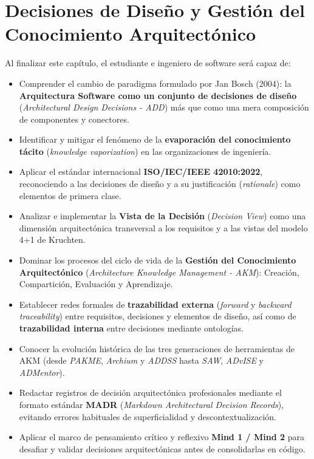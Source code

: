 \chapter{Decisiones de Diseño y Gestión del Conocimiento Arquitectónico}
\label{cap:tema3}

\begin{tcolorbox}[
  enhanced,
  colback=primary!5!bglight,
  colframe=primary,
  arc=3mm,
  boxrule=1pt,
  title={\bfseries\color{white} Objetivos de Aprendizaje del Tema 3},
  coltitle=white
]
Al finalizar este capítulo, el estudiante e ingeniero de software será capaz de:
\begin{itemize}[leftmargin=1.5em]
  \item Comprender el cambio de paradigma formulado por Jan Bosch (2004): la \textbf{Arquitectura Software como un conjunto de decisiones de diseño} (\emph{Architectural Design Decisions - ADD}) más que como una mera composición de componentes y conectores.
  \item Identificar y mitigar el fenómeno de la \textbf{evaporación del conocimiento tácito} (\emph{knowledge vaporization}) en las organizaciones de ingeniería.
  \item Aplicar el estándar internacional \textbf{ISO/IEC/IEEE 42010:2022}, reconociendo a las decisiones de diseño y a su justificación (\emph{rationale}) como elementos de primera clase.
  \item Analizar e implementar la \textbf{Vista de la Decisión} (\emph{Decision View}) como una dimensión arquitectónica transversal a los requisitos y a las vistas del modelo 4+1 de Kruchten.
  \item Dominar los procesos del ciclo de vida de la \textbf{Gestión del Conocimiento Arquitectónico} (\emph{Architecture Knowledge Management - AKM}): Creación, Compartición, Evaluación y Aprendizaje.
  \item Establecer redes formales de \textbf{trazabilidad externa} (\emph{forward} y \emph{backward traceability}) entre requisitos, decisiones y elementos de diseño, así como de \textbf{trazabilidad interna} entre decisiones mediante ontologías.
  \item Conocer la evolución histórica de las tres generaciones de herramientas de AKM (desde \emph{PAKME}, \emph{Archium} y \emph{ADDSS} hasta \emph{SAW}, \emph{ADvISE} y \emph{ADMentor}).
  \item Redactar registros de decisión arquitectónica profesionales mediante el formato estándar \textbf{MADR} (\emph{Markdown Architectural Decision Records}), evitando errores habituales de superficialidad y descontextualización.
  \item Aplicar el marco de pensamiento crítico y reflexivo \textbf{Mind 1 / Mind 2} para desafiar y validar decisiones arquitectónicas antes de consolidarlas en código.
\end{itemize}
\end{tcolorbox}

